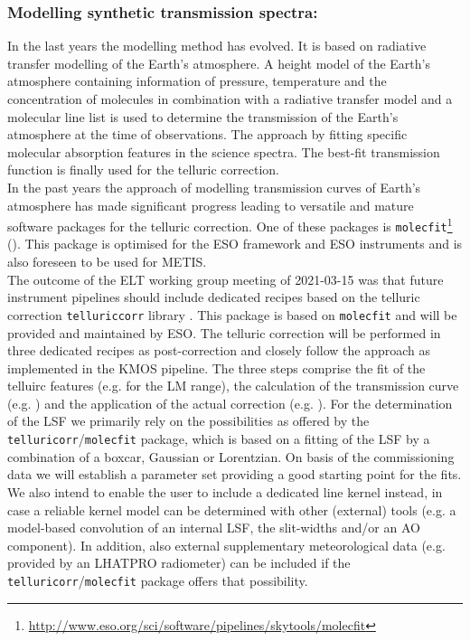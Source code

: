 \subsubsection{Modelling synthetic transmission spectra:}
In the last years the modelling method has evolved. It is based on radiative transfer modelling of the Earth's atmosphere. A height model of the Earth's atmosphere containing information of pressure, temperature and the concentration of molecules in combination with a radiative transfer model and a molecular line list is used to determine the transmission of the Earth's atmosphere at the time of observations. The approach by fitting specific molecular absorption features in the science spectra. The best-fit transmission function is finally used for the telluric correction.\\
In the past years the approach of modelling transmission curves of Earth's atmosphere has made significant progress leading to versatile and mature software packages for the telluric correction. One of these packages is \texttt{molecfit}\footnote{\url{http://www.eso.org/sci/software/pipelines/skytools/molecfit}} (\cite{mf1, mf2, molecfit}). This package is optimised for the ESO framework and ESO instruments and is also foreseen to be used for \ac{METIS}.\\
The outcome of the \ac{ELT} working group meeting of 2021-03-15 was that future instrument pipelines should include dedicated recipes based on the telluric correction \texttt{telluriccorr} library \cite{telluriccorr}. This package is based on \texttt{molecfit} and will be provided and maintained by \ac{ESO}. The telluric correction will be performed in three dedicated recipes as post-correction   and closely follow the approach as implemented in the \ac{KMOS} pipeline. The three steps comprise the fit of the telluirc features (e.g.  for the LM range), the calculation of the transmission curve (e.g. ) and the application of the actual correction (e.g. ). For the determination of the \ac{LSF} we primarily rely on the possibilities as offered by the \texttt{telluricorr}/\texttt{molecfit} package, which is based on a fitting of the \ac{LSF} by a combination of a boxcar, Gaussian or Lorentzian. On basis of the commissioning data we will establish a parameter set providing a good starting point for the fits.\\
We also intend to enable the user to include a dedicated line kernel instead, in case a reliable kernel model can be determined with other (external) tools (e.g. a model-based convolution of an internal \ac{LSF}, the slit-widths and/or an \ac{AO} component). In addition, also external supplementary meteorological data (e.g. provided by an \ac{LHATPRO} radiometer) can be included if the \texttt{telluricorr}/\texttt{molecfit} package offers that possibility.
